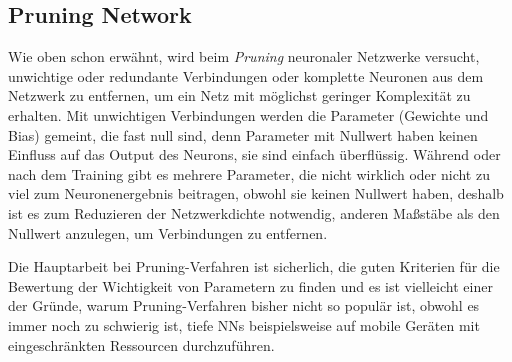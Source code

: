 \documentclass[12pt,a4paper]{scrartcl}
\numberwithin{equation}{section}
\begin{document}
\subsection{Pruning Network}
Wie oben schon erwähnt, wird beim \textit{Pruning} neuronaler Netzwerke versucht, unwichtige oder redundante Verbindungen oder komplette Neuronen aus dem Netzwerk zu entfernen, um ein Netz mit möglichst geringer Komplexität zu erhalten. Mit unwichtigen Verbindungen werden die Parameter (Gewichte und Bias) gemeint, die fast null sind, denn Parameter mit Nullwert haben keinen Einfluss auf das Output des Neurons, sie sind einfach überflüssig. Während oder nach dem Training gibt es mehrere Parameter, die nicht wirklich oder nicht zu viel zum Neuronenergebnis beitragen, obwohl sie keinen Nullwert haben, deshalb ist es zum Reduzieren der Netzwerkdichte notwendig, anderen Maßstäbe als den Nullwert anzulegen, um Verbindungen zu entfernen.

Die Hauptarbeit bei Pruning-Verfahren ist sicherlich, die guten Kriterien für die Bewertung der Wichtigkeit von Parametern zu finden und es ist vielleicht einer der Gründe, warum Pruning-Verfahren bisher nicht so populär ist, obwohl es immer noch zu schwierig ist, tiefe \acsp{NN} beispielsweise auf  mobile Geräten mit eingeschränkten Ressourcen durchzuführen.
\end{document}
